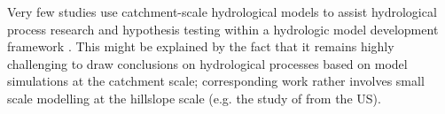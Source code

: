 \documentclass[10pt,a4paper]{article}
\begin{document}
Very few studies use catchment-scale hydrological models to assist hydrological process research and hypothesis testing within a hydrologic model development framework \citep{Clark2016}. This might be explained by the fact that it remains highly challenging to draw conclusions on hydrological processes based on model simulations at the catchment scale; corresponding work rather involves small scale modelling at the hillslope scale (e.g. the study of \citealt{Heuvel2018} from the US).  



\end{document}
